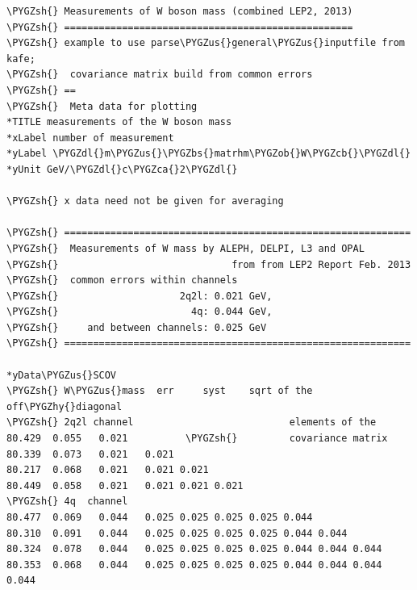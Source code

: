 \documentclass[a4paper,10pt,english]{sphinxmanual}
\def\PYGZbs{\char`\\}
\def\PYGZus{\char`\_}
\def\PYGZob{\char`\{}
\def\PYGZcb{\char`\}}
\def\PYGZca{\char`\^}
\def\PYGZsh{\char`\#}
\def\PYGZdl{\char`\$}
\def\PYGZhy{\char`\-}
\begin{document}
\begin{Verbatim}[commandchars=\\\{\}]
\PYGZsh{} Measurements of W boson mass (combined LEP2, 2013)
\PYGZsh{} ==================================================
\PYGZsh{} example to use parse\PYGZus{}general\PYGZus{}inputfile from kafe;
\PYGZsh{}  covariance matrix build from common errors
\PYGZsh{} ==
\PYGZsh{}  Meta data for plotting
*TITLE measurements of the W boson mass
*xLabel number of measurement
*yLabel \PYGZdl{}m\PYGZus{}\PYGZbs{}matrhm\PYGZob{}W\PYGZcb{}\PYGZdl{}
*yUnit GeV/\PYGZdl{}c\PYGZca{}2\PYGZdl{}

\PYGZsh{} x data need not be given for averaging

\PYGZsh{} ============================================================
\PYGZsh{}  Measurements of W mass by ALEPH, DELPI, L3 and OPAL
\PYGZsh{}                              from from LEP2 Report Feb. 2013
\PYGZsh{}  common errors within channels
\PYGZsh{}                     2q2l: 0.021 GeV,
\PYGZsh{}                       4q: 0.044 GeV,
\PYGZsh{}     and between channels: 0.025 GeV
\PYGZsh{} ============================================================

*yData\PYGZus{}SCOV
\PYGZsh{} W\PYGZus{}mass  err     syst    sqrt of the off\PYGZhy{}diagonal
\PYGZsh{} 2q2l channel                           elements of the
80.429  0.055   0.021          \PYGZsh{}         covariance matrix
80.339  0.073   0.021   0.021
80.217  0.068   0.021   0.021 0.021
80.449  0.058   0.021   0.021 0.021 0.021
\PYGZsh{} 4q  channel
80.477  0.069   0.044   0.025 0.025 0.025 0.025 0.044
80.310  0.091   0.044   0.025 0.025 0.025 0.025 0.044 0.044
80.324  0.078   0.044   0.025 0.025 0.025 0.025 0.044 0.044 0.044
80.353  0.068   0.044   0.025 0.025 0.025 0.025 0.044 0.044 0.044 0.044
\end{Verbatim}
\end{document}
